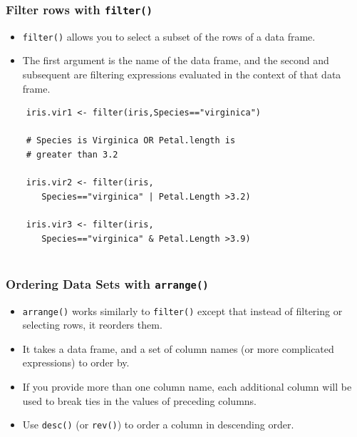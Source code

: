 \documentclass{beamer}
\begin{document}
	
\begin{frame}
\frametitle{Filter rows with \texttt{filter()}}
\begin{itemize}
\item \texttt{filter()} allows you to select a subset of the rows of a data frame. 
\item The first argument is the name of the data frame, and the second and subsequent are filtering expressions evaluated in the context of that data frame.
\end{itemize}



\end{frame}
\begin{frame}[fragile]	
\begin{framed}
\begin{verbatim}
	iris.vir1 <- filter(iris,Species=="virginica")
	
	# Species is Virginica OR Petal.length is 
	# greater than 3.2
	
	iris.vir2 <- filter(iris,
	   Species=="virginica" | Petal.Length >3.2)
	
	iris.vir3 <- filter(iris,
	   Species=="virginica" & Petal.Length >3.9)
	
\end{verbatim}
\end{framed}
\end{frame}
\begin{frame}
\frametitle{Ordering Data Sets with \texttt{arrange()}}
\begin{itemize}
\item \texttt{arrange()} works similarly to \texttt{filter()} except that instead of filtering or selecting rows, it reorders them. 

\item It takes a data frame, and a set of column names (or more complicated expressions) to order by.

\item If you provide more than one column name, each additional column will be used to break ties in the values of preceding columns.

\item Use \texttt{desc()} (or \texttt{rev()}) to order a column in descending order.

\end{itemize}
\end{frame}
\end{document}
